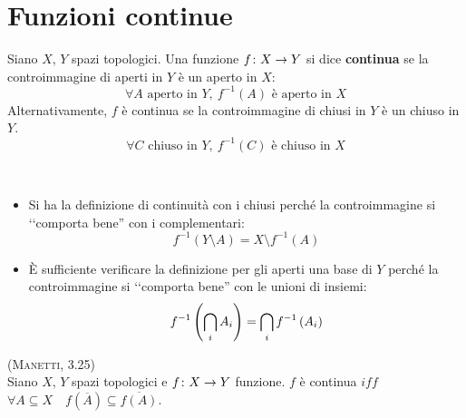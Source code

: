 \section{Funzioni continue}
\begin{define}
Siano $X$, $Y$ spazi topologici. Una funzione $f\colon X\rightarrow Y$ si dice \textbf{continua} se la controimmagine di aperti in $Y$ è un aperto in $X$:
\begin{equation}
\forall A\text{ aperto in } Y,\ f^{-1}\left(A\right) \text{ è aperto in } X
\end{equation}
Alternativamente, $f$ è continua se la controimmagine di chiusi in $Y$ è un chiuso in $Y$.
\begin{equation}
	\forall C\text{ chiuso in } Y,\ f^{-1}\left(C\right) \text{ è chiuso in } X
\end{equation}
\end{define}
\begin{observe}~{}
\begin{itemize}
\item Si ha la definizione di continuità con i chiusi perché la controimmagine si ‘‘comporta bene'' con i complementari:
\begin{equation*}
f^{-1}\left(Y\setminus A\right)=X\setminus f^{-1}\left(A\right)
\end{equation*}
\item È sufficiente verificare la definizione per gli aperti una base di $Y$ perché la controimmagine si ‘‘comporta bene'' con le unioni di insiemi:
\begin{equation*}
f^{-1}\left(\mathop{{\bigcap}}\displaylimits_{i}A_i\right)=\mathop{{\bigcap}}\displaylimits_{i}f^{-1}\left(A_i\right)
\end{equation*}
\end{itemize}
\end{observe}
\begin{lemming}\textsc{(Manetti, 3.25)}\\
Siano $X$, $Y$ spazi topologici e $f\colon X\rightarrow Y$ funzione.
$f$ è continua $iff$ $\forall A\subseteq X\quad f\left(\overline{A}\right)\subseteq\overline{f\left(A\right)}$.
\end{lemming}
